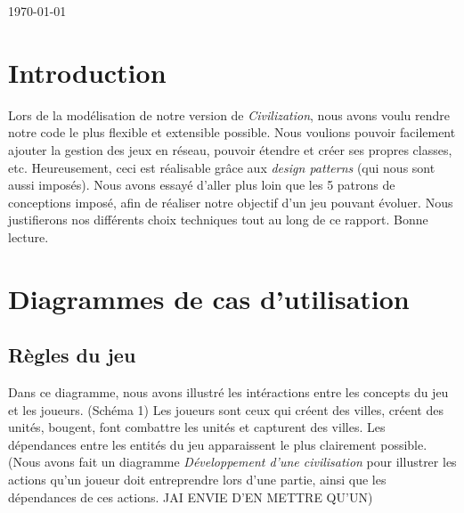 \begin{titlepage}

{\large \today}\\[3cm] %


 

\vfill %

\end{titlepage}

\tableofcontents
{}
\newpage

\section{Introduction}

	Lors de la modélisation de notre version de \textit{Civilization}, nous avons voulu rendre notre code le plus flexible et extensible possible.
Nous voulions pouvoir facilement ajouter la gestion des jeux en réseau, pouvoir étendre et créer ses propres classes, etc.
Heureusement, ceci est réalisable grâce aux \textit{design patterns} (qui nous sont aussi imposés).
Nous avons essayé d'aller plus loin que les 5 patrons de conceptions imposé, afin de réaliser notre objectif d'un jeu pouvant évoluer. Nous justifierons nos différents choix techniques tout au long de ce rapport.
Bonne lecture.

\newpage

\section{Diagrammes de cas d'utilisation}
	\subsection{Règles du jeu}
		Dans ce diagramme, nous avons illustré les intéractions entre les concepts du jeu et les joueurs. (Schéma 1)
	Les joueurs sont ceux qui créent des villes, créent des unités, bougent, font combattre les unités et capturent des villes.
	Les dépendances entre les entités du jeu apparaissent le plus clairement possible.
	(Nous avons fait un diagramme \textit{Développement d'une civilisation} pour illustrer les actions qu'un joueur doit entreprendre lors d'une partie,
	ainsi que les dépendances de ces actions. JAI ENVIE D'EN METTRE QU'UN)
	
